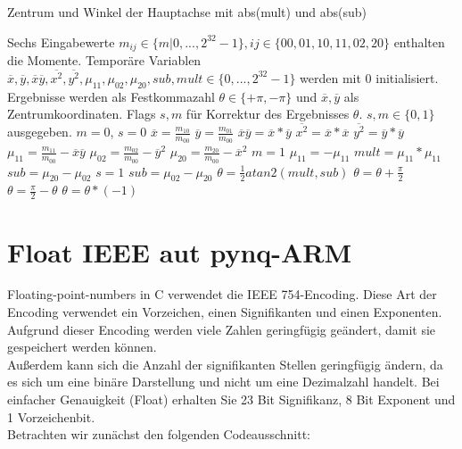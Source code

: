 \documentclass[a4paper]{report}
\begin{document}
\begin{algorithm}
\caption{Zentrum und Winkel der Hauptachse mit abs(mult) und abs(sub)}
\label{Momente}
\begin{algorithmic}[1]
\Require Sechs Eingabewerte {$m_{ij}\in\{m|0,...,2^{32}-1\},ij\in\{00,01,10,11,02,20\}$} enthalten die Momente. Temporäre Variablen $\overline{x},\overline{y},\overline{x}\overline{y},\overline{x^2},\overline{y^2},\mu_{11},\mu_{02},\mu_{20},sub,mult\in \{0,...,2^{32}-1\}$ werden mit 0 initialisiert. Ergebnisse werden als Festkommazahl $\theta \in \{+\pi, -\pi\}$ und  $\overline{x},\overline{y}$ als Zentrumkoordinaten. Flags $s,m$ für Korrektur des Ergebnisses $\theta$. {$s,m\in\{0,1\}$} ausgegeben.
\State $m = 0$, $s = 0$
	\State $\overline{x} = \frac{m_{10}}{m_{00}}$
	\State $\overline{y} = \frac{m_{01}}{m_{00}}$
	\State $\overline{x}\overline{y} = \overline{x} * \overline{y}$
	\State $\overline{x^2} = \overline{x} * \overline{x}$
	\State $\overline{y^2} = \overline{y} * \overline{y}$
	\State $\mu_{11} = \frac{m_{11}}{m_{00}} - \overline{x}\overline{y} $
	\State $\mu_{02} = \frac{m_{02}}{m_{00}} - \overline{y}^2 $
	\State $\mu_{20} = \frac{m_{20}}{m_{00}} - \overline{x}^2 $	
		\State $m = 1$
		\State $\mu_{11} = -\mu_{11}$
	\EndIf
	\State $mult = \mu_{11}* \mu_{11}$
		\State $sub = \mu_{20}-\mu_{02}$
		\State $s = 1$
	\Else
		\State $sub = \mu_{02}-\mu_{20}$
    \EndIf  
	\State $\theta = \frac{1}{2} atan2(mult, sub)$
\EndIf
{}
	\State $\theta = \theta + \frac{\pi}{2}$
	\State $\theta = \frac{\pi}{2} - \theta$
	\State $\theta= \theta*(-1)$
\EndIf  


\end{algorithmic}
\end{algorithm}

\newpage
\section{Float IEEE aut pynq-ARM}

Floating-point-numbers in C verwendet die IEEE 754-Encoding.
Diese Art der Encoding verwendet ein Vorzeichen, einen Signifikanten und einen Exponenten.
Aufgrund dieser Encoding werden viele Zahlen geringfügig geändert, damit sie gespeichert werden können.\\
Außerdem kann sich die Anzahl der signifikanten Stellen geringfügig ändern, da es sich um eine binäre Darstellung und nicht um eine Dezimalzahl handelt. Bei einfacher Genauigkeit (Float) erhalten Sie 23 Bit Signifikanz, 8 Bit Exponent und 1 Vorzeichenbit.\\
Betrachten wir zunächst den folgenden Codeausschnitt:\\
\end{document}
